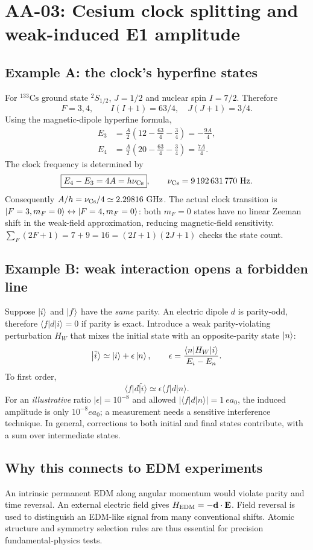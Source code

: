 
\section{AA-03: Cesium clock splitting and weak-induced E1 amplitude}
\subsection*{Example A: the clock's hyperfine states}
For \(^{133}\mathrm{Cs}\) ground state \({}^2S_{1/2}\),
\(J=1/2\) and nuclear spin \(I=7/2\). Therefore
\[
\boxed{F=3,4},\qquad
I(I+1)=63/4,\quad J(J+1)=3/4.
\]
Using the magnetic-dipole hyperfine formula,
\[
\begin{aligned}
E_3&=\frac A2\left(12-\frac{63}{4}-\frac34\right)
=\boxed{-\frac{9A}{4}},\\
E_4&=\frac A2\left(20-\frac{63}{4}-\frac34\right)
=\boxed{\frac{7A}{4}} .
\end{aligned}
\]
The clock frequency is determined by
\[
\boxed{E_4-E_3=4A=h\nu_{\rm Cs}},\qquad
\nu_{\rm Cs}=9\,192\,631\,770\ {\rm Hz}.
\]
Consequently \(A/h=\nu_{\rm Cs}/4
\simeq2.29816\ \mathrm{GHz}\).
The actual clock transition is
\(\left\lvert F=3,m_F=0\right\rangle\leftrightarrow\left\lvert F=4,m_F=0\right\rangle\):
both \(m_F=0\) states have no linear Zeeman shift
in the weak-field approximation, reducing
magnetic-field sensitivity.
\(\sum_F(2F+1)=7+9=16=(2I+1)(2J+1)\)
checks the state count.

\subsection*{Example B: weak interaction opens a forbidden line}
Suppose \(\left\lvert i\right\rangle\) and \(\left\lvert f\right\rangle\) have the \emph{same} parity.
An electric dipole \(d\) is parity-odd, therefore
\(\langle f|d|i\rangle=0\) if parity is exact.
Introduce a weak parity-violating perturbation \(H_W\)
that mixes the initial state with an opposite-parity
state \(\left\lvert n\right\rangle\):
\[
\left\lvert \tilde i\right\rangle\simeq\left\lvert i\right\rangle+
\epsilon\left\lvert n\right\rangle,\qquad
\epsilon=\frac{\langle n|H_W|i\rangle}{E_i-E_n}.
\]
To first order,
\[
\boxed{\langle f|d|\tilde i\rangle
\simeq\epsilon\langle f|d|n\rangle}.
\]
For an \emph{illustrative} ratio
\(|\epsilon|=10^{-8}\) and allowed
\(|\langle f|d|n\rangle|=1\ e a_0\),
the induced amplitude is only
\(10^{-8}ea_0\); a measurement needs a
sensitive interference technique.
In general, corrections to both initial and final
states contribute, with a sum over intermediate states.

\subsection*{Why this connects to EDM experiments}
An intrinsic permanent EDM along angular momentum
would violate parity and time reversal.
An external electric field gives
\(H_{\rm EDM}=-\mathbf d\cdot\mathbf E\).
Field reversal is used to distinguish an EDM-like
signal from many conventional shifts. Atomic
structure and symmetry selection rules are thus
essential for precision fundamental-physics tests.

